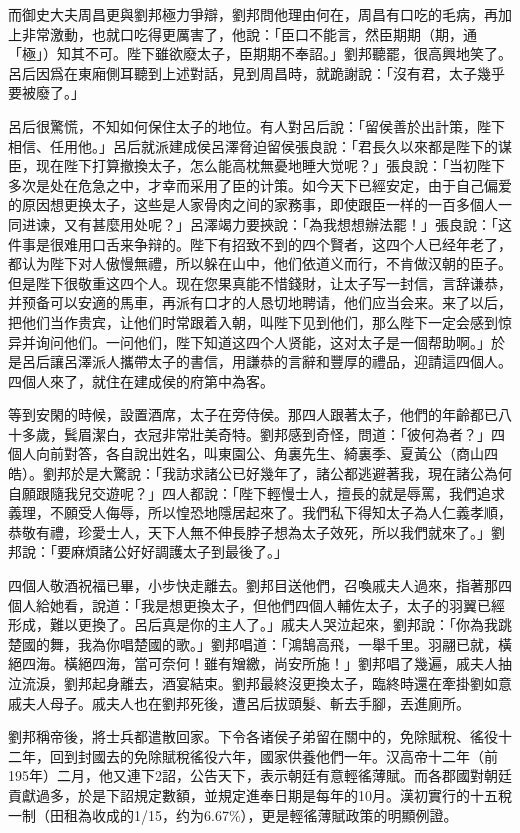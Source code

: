 而御史大夫周昌更與劉邦極力爭辯，劉邦問他理由何在，周昌有口吃的毛病，再加上非常激動，也就口吃得更厲害了，他說：「臣口不能言，然臣期期（期，通「極」）知其不可。陛下雖欲廢太子，臣期期不奉詔。」劉邦聽罷，很高興地笑了。呂后因爲在東廂側耳聽到上述對話，見到周昌時，就跪謝說：「沒有君，太子幾乎要被廢了。」

呂后很驚慌，不知如何保住太子的地位。有人對呂后說：「留侯善於出計策，陛下相信、任用他。」呂后就派建成侯呂澤脅迫留侯張良說：「君長久以來都是陛下的谋臣，现在陛下打算撤換太子，怎么能高枕無憂地睡大觉呢？」張良說：「当初陛下多次是处在危急之中，才幸而采用了臣的计策。如今天下已經安定，由于自己偏爱的原因想更换太子，这些是人家骨肉之间的家務事，即使跟臣一样的一百多個人一同进谏，又有甚麼用处呢？」呂澤竭力要挾說：「為我想想辦法罷！」張良說：「这件事是很难用口舌来争辩的。陛下有招致不到的四个賢者，这四个人已经年老了，都认为陛下对人傲慢無禮，所以躲在山中，他们依道义而行，不肯做汉朝的臣子。但是陛下很敬重这四个人。现在您果真能不惜錢財，让太子写一封信，言辞谦恭，并预备可以安適的馬車，再派有口才的人恳切地聘请，他们应当会来。来了以后，把他们当作贵宾，让他们时常跟着入朝，叫陛下见到他们，那么陛下一定会感到惊异并询问他们。一问他们，陛下知道这四个人贤能，这对太子是一個帮助啊。」於是呂后讓呂澤派人攜帶太子的書信，用謙恭的言辭和豐厚的禮品，迎請這四個人。四個人來了，就住在建成侯的府第中為客。

等到安閑的時候，設置酒席，太子在旁侍侯。那四人跟著太子，他們的年齡都已八十多歲，鬂眉潔白，衣冠非常壯美奇特。劉邦感到奇怪，問道：「彼何為者？」四個人向前對答，各自說出姓名，叫東園公、角裏先生、綺裏季、夏黃公（商山四皓）。劉邦於是大驚說：「我訪求諸公已好幾年了，諸公都逃避著我，現在諸公為何自願跟隨我兒交遊呢？」四人都說：「陛下輕慢士人，擅長的就是辱罵，我們追求義理，不願受人侮辱，所以惶恐地隱居起來了。我們私下得知太子為人仁義孝順，恭敬有禮，珍愛士人，天下人無不伸長脖子想為太子效死，所以我們就來了。」劉邦說：「要麻煩諸公好好調護太子到最後了。」

四個人敬酒祝福已畢，小步快走離去。劉邦目送他們，召喚戚夫人過來，指著那四個人給她看，說道：「我是想更換太子，但他們四個人輔佐太子，太子的羽翼已經形成，難以更換了。呂后真是你的主人了。」戚夫人哭泣起來，劉邦說：「你為我跳楚國的舞，我為你唱楚國的歌。」劉邦唱道：「鴻鵠高飛，一舉千里。羽翮已就，橫絕四海。橫絕四海，當可奈何！雖有矰繳，尚安所施！」劉邦唱了幾遍，戚夫人抽泣流淚，劉邦起身離去，酒宴結束。劉邦最終沒更換太子，臨終時還在牽掛劉如意戚夫人母子。戚夫人也在劉邦死後，遭呂后拔頭髮、斬去手腳，丟進廁所。

劉邦稱帝後，將士兵都遣散回家。下令各诸侯子弟留在關中的，免除賦稅、徭役十二年，回到封國去的免除賦稅徭役六年，國家供養他們一年。汉高帝十二年（前195年）二月，他又連下2詔，公告天下，表示朝廷有意輕徭薄賦。而各郡國對朝廷貢獻過多，於是下詔規定數額，並規定進奉日期是每年的10月。漢初實行的十五稅一制（田租為收成的1/15，约为6.67\%），更是輕徭薄賦政策的明顯例證。

